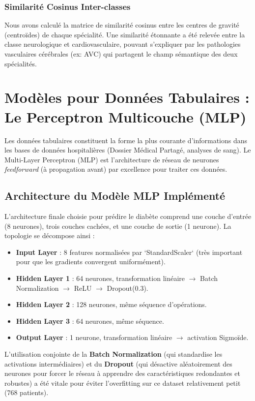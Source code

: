 \documentclass[a4paper,12pt]{report}
\begin{document}
\subsection{Similarité Cosinus Inter-classes}
Nous avons calculé la matrice de similarité cosinus entre les centres de gravité (centroïdes) de chaque spécialité. Une similarité étonnante a été relevée entre la classe neurologique et cardiovasculaire, pouvant s'expliquer par les pathologies vasculaires cérébrales (ex: AVC) qui partagent le champ sémantique des deux spécialités.
\chapter{Modèles pour Données Tabulaires : Le Perceptron Multicouche (MLP)}

Les données tabulaires constituent la forme la plus courante d'informations dans les bases de données hospitalières (Dossier Médical Partagé, analyses de sang). Le Multi-Layer Perceptron (MLP) est l'architecture de réseau de neurones \textit{feedforward} (à propagation avant) par excellence pour traiter ces données.

\section{Architecture du Modèle MLP Implémenté}
L'architecture finale choisie pour prédire le diabète comprend une couche d'entrée (8 neurones), trois couches cachées, et une couche de sortie (1 neurone).
La topologie se décompose ainsi :
\begin{itemize}
    \item \textbf{Input Layer} : 8 features normalisées par `StandardScaler` (très important pour que les gradients convergent uniformément).
    \item \textbf{Hidden Layer 1} : 64 neurones, transformation linéaire $\rightarrow$ Batch Normalization $\rightarrow$ ReLU $\rightarrow$ Dropout(0.3).
    \item \textbf{Hidden Layer 2} : 128 neurones, même séquence d'opérations.
    \item \textbf{Hidden Layer 3} : 64 neurones, même séquence.
    \item \textbf{Output Layer} : 1 neurone, transformation linéaire $\rightarrow$ activation Sigmoïde.
\end{itemize}

L'utilisation conjointe de la \textbf{Batch Normalization} (qui standardise les activations intermédiaires) et du \textbf{Dropout} (qui désactive aléatoirement des neurones pour forcer le réseau à apprendre des caractéristiques redondantes et robustes) a été vitale pour éviter l'overfitting sur ce dataset relativement petit (768 patients).
\end{document}
